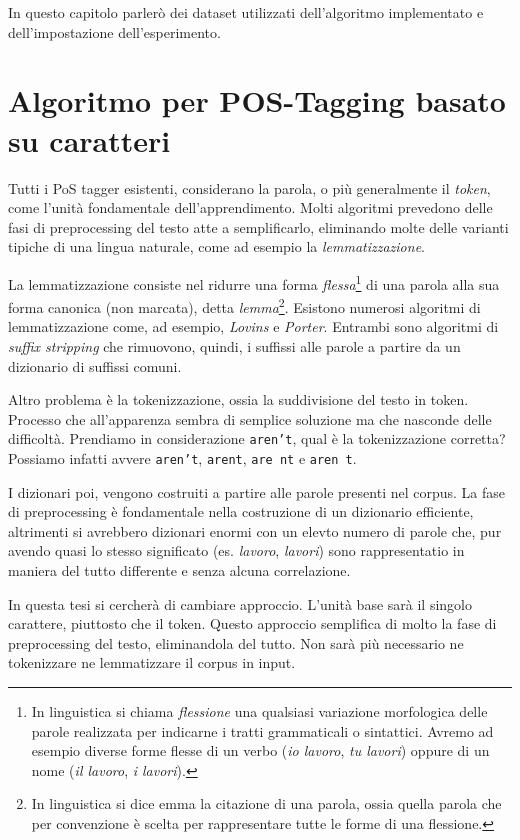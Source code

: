 \nocite{scikit-learn}

In questo capitolo parler\`o dei dataset utilizzati dell'algoritmo implementato
e dell'impostazione dell'esperimento.

\section{Algoritmo per POS-Tagging basato su caratteri}

Tutti i PoS tagger esistenti, considerano la parola, o pi\`u generalmente il
\emph{token}, come l'unit\`a fondamentale dell'apprendimento. Molti algoritmi
prevedono delle fasi di preprocessing del testo atte a semplificarlo, eliminando
molte delle varianti tipiche di una lingua naturale, come ad esempio la \emph{lemmatizzazione}.

La lemmatizzazione consiste nel ridurre una forma \emph{flessa}\footnote{In
linguistica si chiama \emph{flessione} una qualsiasi variazione morfologica delle
parole realizzata per indicarne i tratti grammaticali o sintattici. Avremo ad
esempio diverse forme flesse di un verbo (\emph{io lavoro}, \emph{tu lavori})
oppure di un nome (\emph{il lavoro}, \emph{i lavori}).} di una parola alla sua
forma canonica (non marcata), detta \emph{lemma}\footnote{In linguistica si dice
emma la citazione di una parola, ossia quella parola che per convenzione è scelta
per rappresentare tutte le forme di una flessione.}. Esistono numerosi algoritmi
di lemmatizzazione come, ad esempio, \emph{Lovins} e \emph{Porter}. Entrambi sono
algoritmi di \emph{suffix stripping} che rimuovono, quindi, i suffissi alle
parole a partire da un dizionario di suffissi comuni.

Altro problema \`e la tokenizzazione, ossia la suddivisione del testo in token.
Processo che all'apparenza sembra di semplice soluzione ma che nasconde delle
difficolt\`a. Prendiamo in considerazione \texttt{aren't}, qual \`e la tokenizzazione
corretta? Possiamo infatti avvere \texttt{aren't}, \texttt{arent}, \texttt{are nt}
e \texttt{aren t}.

I dizionari poi, vengono costruiti a partire alle parole presenti nel corpus.
La fase di preprocessing \`e fondamentale nella costruzione di un dizionario
efficiente, altrimenti si avrebbero dizionari enormi con un elevto numero di
parole che, pur avendo quasi lo stesso significato (es. \emph{lavoro}, \emph{lavori})
sono rappresentatio in maniera del tutto differente e senza alcuna correlazione.

In questa tesi si cercher\`a di cambiare approccio. L'unit\`a base sar\`a il
singolo carattere, piuttosto che il token. Questo approccio semplifica di molto
la fase di preprocessing del testo, eliminandola del tutto. Non sar\`a pi\`u
necessario ne tokenizzare ne lemmatizzare il corpus in input.

